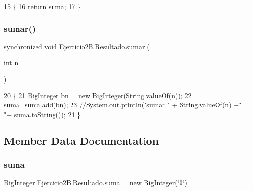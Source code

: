 \begin{DoxyCode}
15     \{
16         \textcolor{keywordflow}{return} \mbox{\hyperlink{class_ejercicio2_b_1_1_resultado_a4fe8f3cecd2e27923714cde5de400b5d}{suma}};
17     \}
\end{DoxyCode}
\mbox{\label{class_ejercicio2_b_1_1_resultado_ae929ed7dc91fea822e0b9807ac130088}} 
\subsubsection{\texorpdfstring{sumar()}{sumar()}}
{\footnotesize\ttfamily synchronized void Ejercicio2\+B.\+Resultado.\+sumar (\begin{DoxyParamCaption}\item[{int}]{n }\end{DoxyParamCaption})\hspace{0.3cm}{\ttfamily [inline]}}


\begin{DoxyCode}
20     \{
21         BigInteger bn = \textcolor{keyword}{new} BigInteger(String.valueOf(n));
22         \mbox{\hyperlink{namespacesuma}{suma}}=\mbox{\hyperlink{namespacesuma}{suma}}.add(bn);
23         \textcolor{comment}{//System.out.println("sumar " + String.valueOf(n) +" = "+ suma.toString());}
24     \}
\end{DoxyCode}


\subsection{Member Data Documentation}
\mbox{\label{class_ejercicio2_b_1_1_resultado_a4fe8f3cecd2e27923714cde5de400b5d}} 
\subsubsection{\texorpdfstring{suma}{suma}}
{\footnotesize\ttfamily Big\+Integer Ejercicio2\+B.\+Resultado.\+suma = new Big\+Integer(\char`\"{}0\char`\"{})\hspace{0.3cm}{\ttfamily [private]}}

